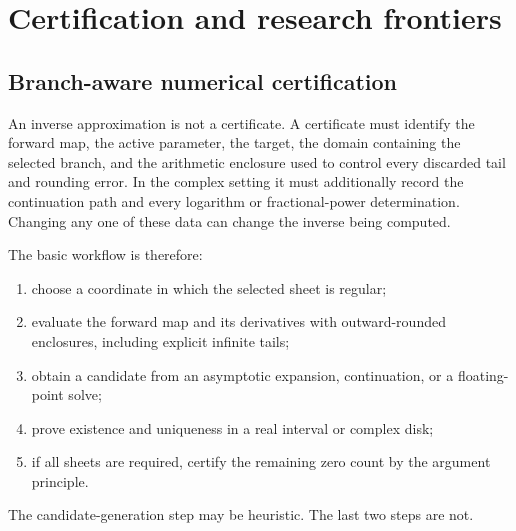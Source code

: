 
\newcommand{\CertifiedEnclosureCenter}[1]{\widehat{#1}}
\newcommand{\FormalGevreySeriesSymbol}[1]{\widehat{#1}}

\chapter{Certification and research frontiers}
\label{chap:certification-and-frontiers}

\section{Branch-aware numerical certification}
\label{sec:certification-frontiers}

An inverse approximation is not a certificate.  A certificate must identify
the forward map, the active parameter, the target, the domain containing the
selected branch, and the arithmetic enclosure used to control every discarded
tail and rounding error.  In the complex setting it must additionally record
the continuation path and every logarithm or fractional-power determination.
Changing any one of these data can change the inverse being computed.

The basic workflow is therefore:
\begin{enumerate}
\item choose a coordinate in which the selected sheet is regular;
\item evaluate the forward map and its derivatives with outward-rounded
      enclosures, including explicit infinite tails;
\item obtain a candidate from an asymptotic expansion, continuation, or a
      floating-point solve;
\item prove existence and uniqueness in a real interval or complex disk;
\item if all sheets are required, certify the remaining zero count by the
      argument principle.
\end{enumerate}
The candidate-generation step may be heuristic.  The last two steps are not.

